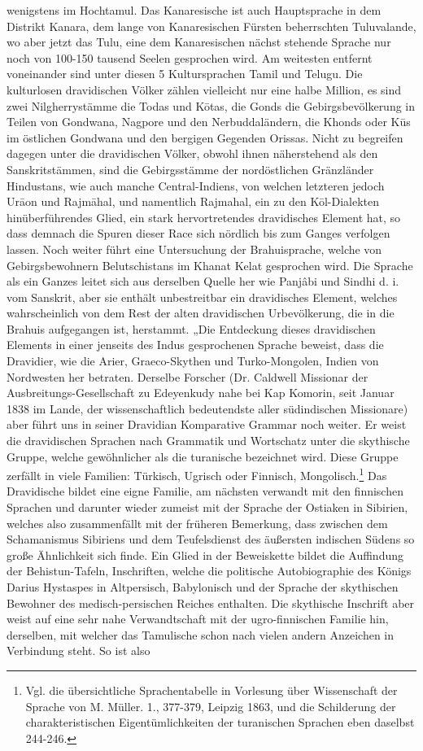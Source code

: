 \documentclass{article}
\begin{document}
wenigstens im Hochtamul. Das Kanaresische ist auch Hauptsprache in dem Distrikt Kanara, dem lange von Kanaresischen Fürsten beherrschten Tuluvalande, wo aber jetzt das Tulu, eine dem Kanaresischen nächst stehende Sprache nur noch von 100-150 tausend Seelen gesprochen wird. Am weitesten entfernt voneinander sind unter diesen 5 Kultursprachen Tamil und Telugu. Die kulturlosen dravidischen Völker zählen vielleicht nur eine halbe Million, es sind zwei Nilgherrystämme die Todas und K\={o}tas, die Gonds die Gebirgsbevölkerung in Teilen von Gondwana, Nagpore und den Nerbuddaländern, die Khonds oder K\={u}s im östlichen Gondwana und den bergigen Gegenden Orissas. Nicht zu begreifen dagegen unter die dravidischen Völker, obwohl ihnen näherstehend als den Sanskritstämmen, sind die Gebirgsstämme der nordöstlichen Gränzländer Hindustans, wie auch manche Central-Indiens, von welchen letzteren jedoch Ur\={a}on und Rajm\={a}hal, und namentlich Rajmahal, ein zu den K\={o}l-Dialekten hinüberführendes Glied, ein stark hervortretendes dravidisches Element hat, so dass demnach die Spuren dieser Race sich nördlich bis zum Ganges verfolgen lassen. Noch weiter führt eine Untersuchung der Brahuisprache, welche von Gebirgsbewohnern Belutschistans im Khanat Kelat gesprochen wird. Die Sprache als ein Ganzes leitet sich aus derselben Quelle her wie Panjâbi und Sindhi d. i. vom Sanskrit, aber sie enthält unbestreitbar ein dravidisches Element, welches wahrscheinlich von dem Rest der alten dravidischen Urbevölkerung, die in die Brahuis aufgegangen ist, herstammt. „Die Entdeckung dieses dravidischen Elements in einer jenseits des Indus gesprochenen Sprache beweist, dass die Dravidier, wie die Arier, Graeco-Skythen und Turko-Mongolen, Indien von Nordwesten her betraten. Derselbe Forscher (Dr. Caldwell Missionar der Ausbreitungs-Gesellschaft zu Edeyenkudy nahe bei Kap Komorin, seit Januar 1838 im Lande, der wissenschaftlich bedeutendste aller südindischen Missionare) aber führt uns in seiner Dravidian Komparative Grammar noch weiter. Er weist die dravidischen Sprachen nach Grammatik und Wortschatz unter die skythische Gruppe, welche gewöhnlicher als die turanische bezeichnet wird. Diese Gruppe zerfällt in viele Familien: Türkisch, Ugrisch oder Finnisch, Mongolisch.\footnote{Vgl. die übersichtliche Sprachentabelle in Vorlesung über Wissenschaft der Sprache von M. Müller. 1., 377-379, Leipzig 1863, und die Schilderung der charakteristischen Eigentümlichkeiten der turanischen Sprachen eben daselbst 244-246.} Das Dravidische bildet eine eigne Familie, am nächsten verwandt mit den finnischen Sprachen und darunter wieder zumeist mit der Sprache der Ostiaken in Sibirien, welches also zusammenfällt mit der früheren Bemerkung, dass zwischen dem Schamanismus Sibiriens und dem Teufelsdienst des äußersten indischen Südens so große Ähnlichkeit sich finde. Ein Glied in der Beweiskette bildet die Auffindung der Behistun-Tafeln, Inschriften, welche die politische Autobiographie des Königs Darius Hystaspes in Altpersisch, Babylonisch und der Sprache der skythischen Bewohner des medisch-persischen Reiches enthalten. Die skythische Inschrift aber weist auf eine sehr nahe Verwandtschaft mit der ugro-finnischen Familie hin, derselben, mit welcher das Tamulische schon nach vielen andern Anzeichen in Verbindung steht. So ist also 
\end{document}
